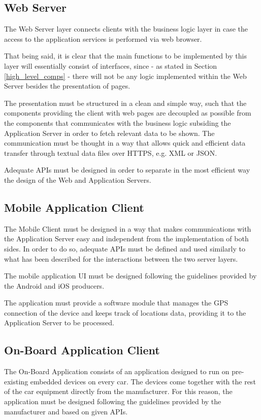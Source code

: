 \subsection{Web Server}
The Web Server layer connects clients with the business logic layer in case the access to the application services is performed via web browser.

That being said, it is clear that the main functions to be implemented by this layer will essentially consist of interfaces, since - as stated in Section \ref{high_level_comps} - there will not be any logic implemented within the Web Server besides the presentation of pages.

The presentation must be structured in a clean and simple way, such that the components providing the client with web pages are decoupled as possible from the components that communicates with the business logic subsiding the Application Server in order to fetch relevant data to be shown. The communication must be thought in a way that allows quick and efficient data transfer through textual data files over HTTPS, e.g. XML or JSON.

Adequate APIs must be designed in order to separate in the most efficient way the design of the Web and Application Servers.

\subsection{Mobile Application Client}
The Mobile Client must be designed in a way that makes communications with the Application Server easy and independent from the implementation of both sides. In order to do so, adequate APIs must be defined and used similarly to what has been described for the interactions between the two server layers.

The mobile application UI must be designed following the guidelines provided by the Android and iOS producers.

The application must provide a software module that manages the GPS connection of the device and keeps track of locations data, providing it to the Application Server to be processed.

\subsection{On-Board Application Client}
The On-Board Application consists of an application designed to run on pre-existing embedded devices on every car. The devices come together with the rest of the car equipment directly from the manufacturer. For this reason, the application must be designed following the guidelines provided by the manufacturer and based on given APIs.

